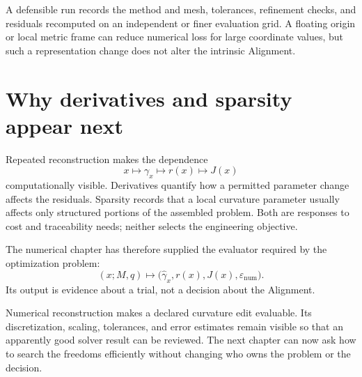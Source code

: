 A defensible run records the method and mesh, tolerances, refinement checks,
and residuals recomputed on an independent or finer evaluation grid. A
floating origin or local metric frame can reduce numerical loss for large
coordinate values, but such a representation change does not alter the
intrinsic Alignment.

\section{Why derivatives and sparsity appear next}

Repeated reconstruction makes the dependence
\[
x\longmapsto\gamma_x\longmapsto r(x)\longmapsto J(x)
\]
computationally visible. Derivatives quantify how a permitted parameter
change affects the residuals. Sparsity records that a local curvature
parameter usually affects only structured portions of the assembled problem.
Both are responses to cost and traceability needs; neither selects the
engineering objective.

The numerical chapter has therefore supplied the evaluator required by the
optimization problem:
\[
(x;M,q)\longmapsto
\bigl(\widehat\gamma_x,r(x),J(x),\varepsilon_{\mathrm{num}}\bigr).
\]
Its output is evidence about a trial, not a decision about the Alignment.

\begin{summary}
Numerical reconstruction makes a declared curvature edit evaluable. Its
discretization, scaling, tolerances, and error estimates remain visible so
that an apparently good solver result can be reviewed. The next chapter can
now ask how to search the freedoms efficiently without changing who owns the
problem or the decision.
\end{summary}
